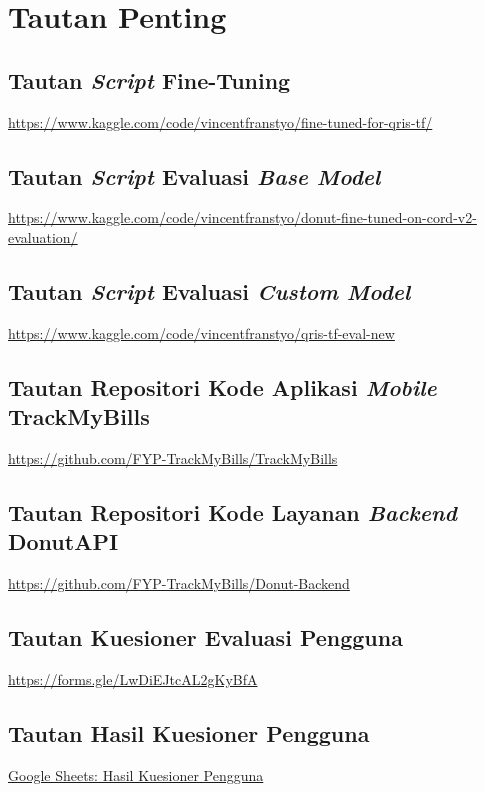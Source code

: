 \chapter{Tautan Penting}
\label{chapter:tautan-penting}

\section{Tautan \emph{Script} Fine-Tuning}
\href{https://www.kaggle.com/code/vincentfranstyo/fine-tuned-for-qris-tf/}{https://www.kaggle.com/code/vincentfranstyo/fine-tuned-for-qris-tf/}

\section{Tautan \emph{Script} Evaluasi \emph{Base Model}}
\href{https://www.kaggle.com/code/vincentfranstyo/donut-fine-tuned-on-cord-v2-evaluation/}{https://www.kaggle.com/code/vincentfranstyo/donut-fine-tuned-on-cord-v2-evaluation/}

\section{Tautan \emph{Script} Evaluasi \emph{Custom Model}}
\href{https://www.kaggle.com/code/vincentfranstyo/qris-tf-eval-new}{https://www.kaggle.com/code/vincentfranstyo/qris-tf-eval-new}

\section{Tautan Repositori Kode Aplikasi \emph{Mobile} TrackMyBills}
\href{https://github.com/FYP-TrackMyBills/TrackMyBills}{https://github.com/FYP-TrackMyBills/TrackMyBills}

\section{Tautan Repositori Kode Layanan \emph{Backend} DonutAPI}
\href{https://github.com/FYP-TrackMyBills/Donut-Backend}
{https://github.com/FYP-TrackMyBills/Donut-Backend}

\section{Tautan Kuesioner Evaluasi Pengguna}
\href{https://forms.gle/LwDiEJtcAL2gKyBfA}{https://forms.gle/LwDiEJtcAL2gKyBfA}

\section{Tautan Hasil Kuesioner Pengguna}
\href{https://docs.google.com/spreadsheets/d/1a2Q1Kio0whC7-fwUD3y7AQzv5Cw0PaTOwEdsp9prtck/edit?resourcekey=&gid=529123852#gid=529123852}{Google Sheets: Hasil Kuesioner Pengguna}